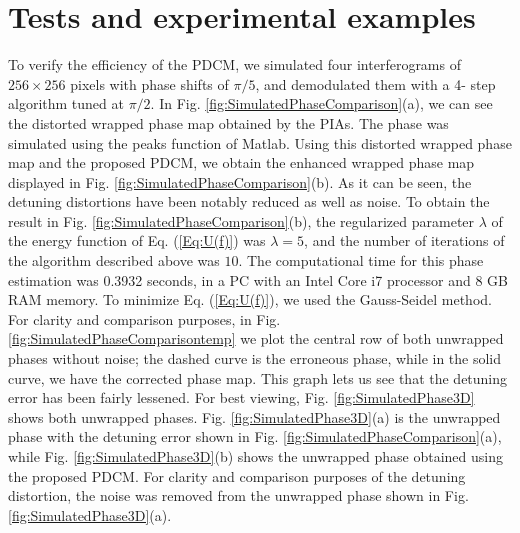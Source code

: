 \section{Tests and experimental examples}
To verify the efficiency of the PDCM, we simulated four interferograms of $256 
\times 256$ pixels with phase shifts of $\pi/5$, and demodulated them with a 4-
step algorithm tuned at $\pi/2$. In Fig. \ref{fig:SimulatedPhaseComparison}(a), 
we can see the distorted wrapped phase map obtained by the PIAs. The phase was 
simulated using the peaks function of Matlab. Using this distorted wrapped
phase map and the proposed PDCM, we obtain the enhanced wrapped phase map 
displayed in Fig. \ref{fig:SimulatedPhaseComparison}(b). As it can be seen, the 
detuning distortions have been notably reduced as well as noise. To obtain the
result in Fig. \ref{fig:SimulatedPhaseComparison}(b), the regularized parameter
$\lambda$ of the energy function of Eq. (\ref{Eq:U(f)}) was $\lambda=5$, and the
number of iterations of the algorithm described above was $10$. The
computational time for this phase estimation was 0.3932 seconds, in a PC with
an Intel Core i7 processor and 8 GB RAM memory. To minimize Eq. (\ref{Eq:U(f)}),
we used the Gauss-Seidel method. For clarity and comparison purposes, in Fig. 
\ref{fig:SimulatedPhaseComparisontemp} we plot the central row of both 
unwrapped phases without noise; the dashed curve is the erroneous phase, while
in the solid curve, we have the corrected phase map. This graph lets us see that
the detuning error has been fairly lessened. For best viewing, Fig. 
\ref{fig:SimulatedPhase3D} shows both unwrapped phases. Fig. 
\ref{fig:SimulatedPhase3D}(a) is the unwrapped phase with the detuning error 
shown in Fig. \ref{fig:SimulatedPhaseComparison}(a), while Fig. 
\ref{fig:SimulatedPhase3D}(b) shows the unwrapped phase obtained using the 
proposed PDCM.  For clarity and comparison purposes of the detuning 
distortion, the noise was removed from the unwrapped phase shown in Fig.
\ref{fig:SimulatedPhase3D}(a).
